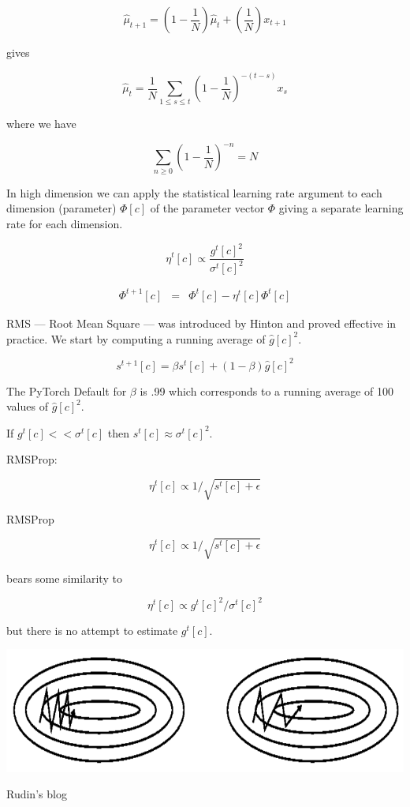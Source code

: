 {$$\hat{\mu}_{t+1} = \left(1-\frac{1}{N}\right)\hat{\mu}_t + \left(\frac{1}{N}\right)x_{t+1}$$

\vfill
gives

$$\hat{\mu}_t = \frac{1}{N} \sum_{1 \leq s \leq t} \left(1-\frac{1}{N}\right)^{-(t-s)} x_s$$

\vfill
where we have

$$\sum_{n\geq 0} \left(1-\frac{1}{N}\right)^{-n} = N$$



In high dimension we can apply the statistical learning rate argument to each dimension (parameter) $\Phi[c]$ of the parameter vector $\Phi$ giving a separate learning rate for each dimension.

\vfill
$$\eta^t[c] \propto \frac{g^t[c]^2}{\sigma^t[c]^2}$$

\vfill
\begin{eqnarray*}
  \Phi^{t+1}[c] & = & \Phi^t[c] - \eta^t[c]\Phi^t[c]
\end{eqnarray*}



RMS --- Root Mean Square --- was introduced by Hinton and proved effective in practice. We start by computing a running average of $\hat{g}[c]^2$.

$$s^{t+1}[c] = \beta s^t[c] + \left(1-\beta\right) \hat{g}[c]^2$$

\vfill
The PyTorch Default for $\beta$ is .99 which corresponds to a running average of 100 values of $\hat{g}[c]^2$.

\vfill
If $g^t[c] << \sigma^t[c]$ then $s^t[c] \approx \sigma^t[c]^2$.

\vfill
RMSProp:

$$\eta^t[c] \propto 1/\sqrt{s^t[c] + \epsilon}$$


\vfill
RMSProp

\vfill
$$\eta^t[c] \propto 1/\sqrt{s^t[c] + \epsilon}$$

\vfill
bears some similarity to

\vfill
$$\eta^t[c] \propto g^t[c]^2/\sigma^t[c]^2$$

\vfill
but there is no attempt to estimate $g^t[c]$.


\centerline{\includegraphics[width = 6in]{../images/momentum}}
\centerline{\Large Rudin's blog}

}
